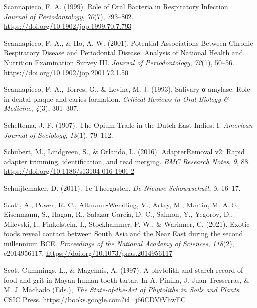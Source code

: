 \documentclass[
  letterpaper,
]{book}
\newlength{\cslhangindent}
\newlength{\cslentryspacingunit} %
\newenvironment{CSLReferences}[2] %
 {%
  \setlength{\parindent}{0pt}
  \ifodd #1
  \let\oldpar\par
  \def\par{\hangindent=\cslhangindent\oldpar}
  \fi
  \setlength{\parskip}{#2\cslentryspacingunit}
 }%
 {}
\begin{document}
\begin{CSLReferences}{1}{0}
\leavevmode{}%
Scannapieco, F. A. (1999). Role of {Oral Bacteria} in {Respiratory
Infection}. \emph{Journal of Periodontology}, \emph{70}(7), 793--802.
\url{https://doi.org/10.1902/jop.1999.70.7.793}

\leavevmode{}%
Scannapieco, F. A., \& Ho, A. W. (2001). Potential {Associations Between
Chronic Respiratory Disease} and {Periodontal Disease}: {Analysis} of
{National Health} and {Nutrition Examination Survey III}. \emph{Journal
of Periodontology}, \emph{72}(1), 50--56.
\url{https://doi.org/10.1902/jop.2001.72.1.50}

\leavevmode{}%
Scannapieco, F. A., Torres, G., \& Levine, M. J. (1993). Salivary
α-amylase: Role in dental plaque and caries formation. \emph{Critical
Reviews in Oral Biology \& Medicine}, \emph{4}(3), 301--307.

\leavevmode{}%
Scheltema, J. F. (1907). The {Opium Trade} in the {Dutch East Indies}.
{I}. \emph{American Journal of Sociology}, \emph{13}(1), 79--112.

\leavevmode{}%
Schubert, M., Lindgreen, S., \& Orlando, L. (2016). {AdapterRemoval} v2:
Rapid adapter trimming, identification, and read merging. \emph{BMC
Research Notes}, \emph{9}, 88.
\url{https://doi.org/10.1186/s13104-016-1900-2}

\leavevmode{}%
Schuijtemaker, D. (2011). Te Theegasten. \emph{De Nieuwe Schouwschuit},
\emph{9}, 16--17.

\leavevmode{}%
Scott, A., Power, R. C., Altmann-Wendling, V., Artzy, M., Martin, M. A.
S., Eisenmann, S., Hagan, R., Salazar-García, D. C., Salmon, Y.,
Yegorov, D., Milevski, I., Finkelstein, I., Stockhammer, P. W., \&
Warinner, C. (2021). Exotic foods reveal contact between {South Asia}
and the {Near East} during the second millennium {BCE}.
\emph{Proceedings of the National Academy of Sciences}, \emph{118}(2),
e2014956117. \url{https://doi.org/10.1073/pnas.2014956117}

\leavevmode{}%
Scott Cummings, L., \& Magennis, A. (1997). A phytolith and starch
record of food and grit in {Mayan} human tooth tartar. In A. Pinilla, J.
Juan-Tresserras, \& M. J. Machado (Eds.), \emph{The {State-of-the-Art}
of {Phytoliths} in {Soils} and {Plants}}. {CSIC Press}.
\url{https://books.google.com?id=j66CDVfVhwEC}


\end{CSLReferences}
\end{document}
